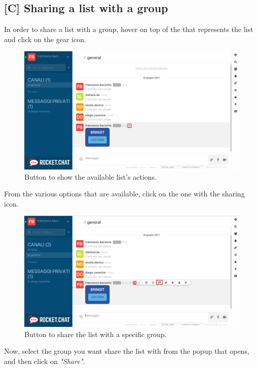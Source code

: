 \newpage
\subsection{[C] Sharing a list with a group}
In order to share a list with a group, hover on top of the  that represents the list and click on the gear icon.

\begin{figure}[H]
  \centering 
  \includegraphics[width=\textwidth]{Sections/3-HowToUse/Images/bubble_options_button.png}
  \caption{Button to show the available list's actions.}
\end{figure}

From the various options that are available, click on the one with the sharing icon.

\begin{figure}[H]
  \centering 
  \includegraphics[width=\textwidth]{Sections/3-HowToUse/Images/bubble_option_share_group.png}
  \caption{Button to share the list with a specific group.}
\end{figure}

Now, select the group you want share the list with from the popup that opens, and then click on \textit{"Share"}. \\

